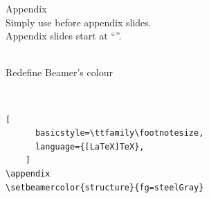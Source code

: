 \documentclass[aspectratio=169,12pt]{beamer}
\begin{document}
\begin{frame}[fragile]{Appendix}
  \\
  Simply use  before appendix slides.\\
  Appendix slides start at ``''.

  \medskip
  \\
  Redefine Beamer's  colour

  \medskip
  \\
  \begin{lstlisting}[
      basicstyle=\ttfamily\footnotesize,
      language={[LaTeX]TeX},
    ]
\appendix
\setbeamercolor{structure}{fg=steelGray}
  \end{lstlisting}

\end{frame}
\end{document}
